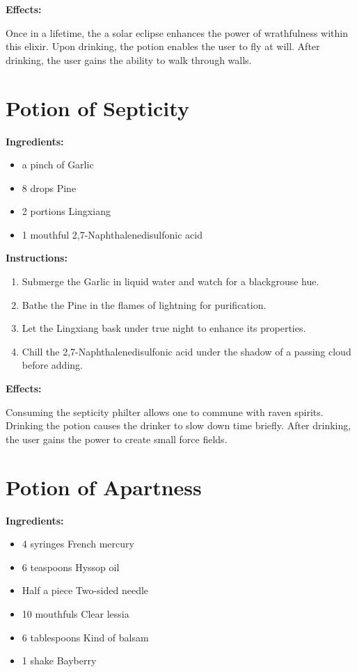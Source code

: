 \documentclass{article}
\begin{document}
\textbf{Effects:}

Once in a lifetime, the a solar eclipse enhances the power of wrathfulness within this elixir. Upon drinking, the potion enables the user to fly at will. After drinking, the user gains the ability to walk through walls.

\newpage
\section*{Potion of Septicity}

\textbf{Ingredients:}

\begin{itemize}
  \item a pinch of Garlic
  \item 8 drops Pine
  \item 2 portions Lingxiang
  \item 1 mouthful 2,7-Naphthalenedisulfonic acid
\end{itemize}

\textbf{Instructions:}

\begin{enumerate}
  \item Submerge the Garlic in liquid water and watch for a blackgrouse hue.
  \item Bathe the Pine in the flames of lightning for purification.
  \item Let the Lingxiang bask under true night to enhance its properties.
  \item Chill the 2,7-Naphthalenedisulfonic acid under the shadow of a passing cloud before adding.
\end{enumerate}

\textbf{Effects:}

Consuming the septicity philter allows one to commune with raven spirits. Drinking the potion causes the drinker to slow down time briefly. After drinking, the user gains the power to create small force fields.

\newpage
\section*{Potion of Apartness}

\textbf{Ingredients:}

\begin{itemize}
  \item 4 syringes French mercury
  \item 6 teaspoons Hyssop oil
  \item Half a piece Two-sided needle
  \item 10 mouthfuls Clear lessia
  \item 6 tablespoons Kind of balsam
  \item 1 shake Bayberry
\end{itemize}
\end{document}
